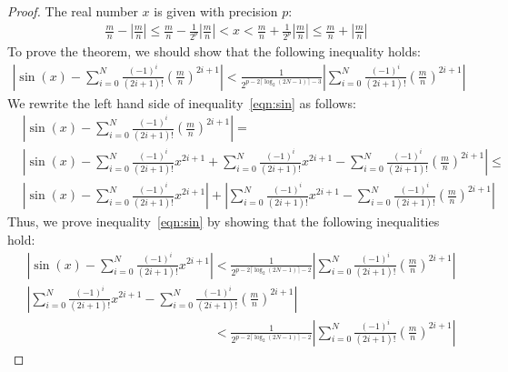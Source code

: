 \documentclass{article}
\numberwithin{mytheorem}{section}
\newcommand{\taylorsin}[3] {\sum_{i=#1}^{#2}\frac{(-1)^i}{(2i+1)!}{#3}^{2i+1}}
\begin{document}
\begin{proof}
The real number $x$ is given with precision $p$:
\begin{align}
\frac{m}{n}-|\frac{m}{n}|\leq \frac{m}{n}-\frac{1}{2^p}|\frac{m}{n}|<x<\frac{m}{n}+\frac{1}{2^p}|\frac{m}{n}|\leq \frac{m}{n}+|\frac{m}{n}|\label{eqn:sin_bound}
\end{align}
To prove the theorem, we should show that the following inequality holds:
\begin{align}
|\sin(x)-\taylorsin{0}{N}{(\frac{m}{n})}|<\frac{1}{2^{p-2\lceil\log_2(2N-1)\rceil-3}}|\taylorsin{0}{N}{(\frac{m}{n})}|\label{eqn:sin}
\end{align}
We rewrite the left hand side of inequality~\eqref{eqn:sin} as follows:
\begin{align*}
&|\sin(x)-\taylorsin{0}{N}{(\frac{m}{n})}|=\\
&|\sin(x)-\taylorsin{0}{N}{x}+\taylorsin{0}{N}{x}-\taylorsin{0}{N}{(\frac{m}{n})}|\leq \\
&|\sin(x)-\taylorsin{0}{N}{x}|+|\taylorsin{0}{N}{x}-\taylorsin{0}{N}{(\frac{m}{n})}|
\end{align*}
Thus, we prove inequality~\eqref{eqn:sin} by showing that the following inequalities hold:
\begin{align}
&|\sin(x)-\taylorsin{0}{N}{x}|<\frac{1}{2^{p-2\lceil\log_2(2N-1)\rceil-2}}|\taylorsin{0}{N}{(\frac{m}{n})}|\label{eqn:sin_part_1}\\
&|\taylorsin{0}{N}{x}-\taylorsin{0}{N}{(\frac{m}{n})}|\nonumber\\
&\phantom{|\sin(x)-\taylorsin{0}{N}{x}|}<\frac{1}{2^{p-2\lceil\log_2(2N-1)\rceil-2}}|\taylorsin{0}{N}{(\frac{m}{n})}|\label{eqn:sin_part_2}
\end{align}


\end{proof}
\end{document}
